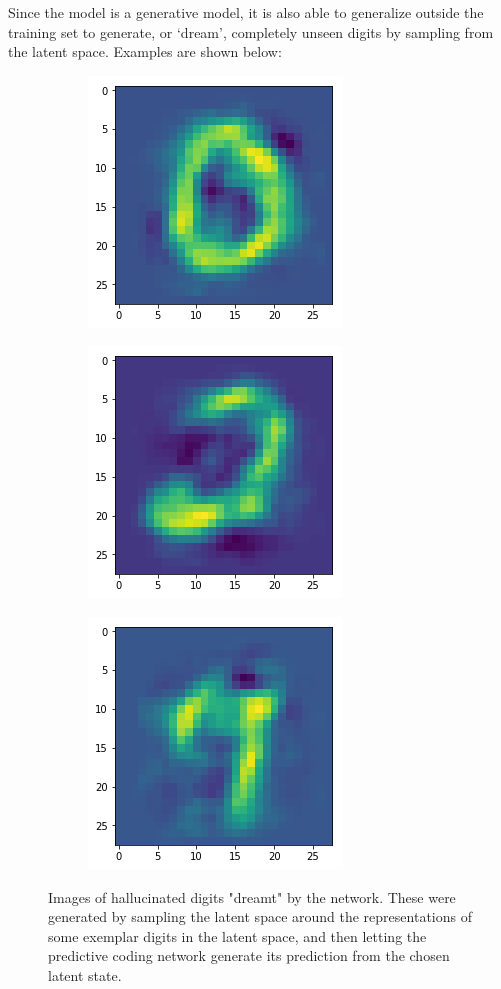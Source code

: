 Since the model is a generative model, it is also able to generalize outside the training set to generate, or `dream', completely unseen digits by sampling from the latent space. Examples are shown below:

\begin{figure}[htb]
\centering
\begin{subfigure}{.3\linewidth}
 \centering
 \includegraphics[scale=0.4]{chapter_3_figures/test_test_0.png}
\end{subfigure}
 \hfill
\begin{subfigure}{.3\linewidth}
 \centering
 \includegraphics[scale=0.4]{chapter_3_figures/test_test_2.png}
\end{subfigure}
 \hfill
\begin{subfigure}{.3\linewidth}
 \centering
 \includegraphics[scale=0.4]{chapter_3_figures/test_test_7.png}
\end{subfigure}
\caption{Images of hallucinated digits "dreamt" by the network. These were generated by sampling the latent space around the representations of some exemplar digits in the latent space, and then letting the predictive coding network generate its prediction from the chosen latent state.}
\end{figure}

